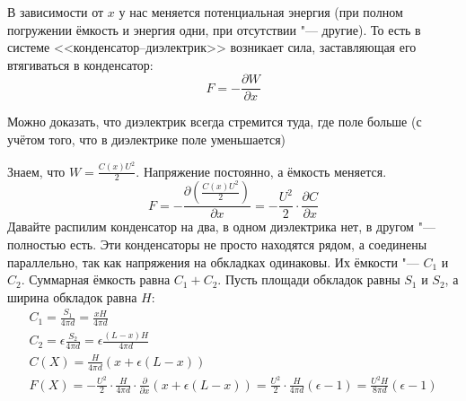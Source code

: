 		В зависимости от $x$ у нас меняется потенциальная энергия (при полном погружении ёмкость и энергия одни,
		при отсутствии "--- другие).
		То есть в системе <<конденсатор--диэлектрик>> возникает сила, заставляющая его втягиваться в конденсатор:
		\[ F = - \frac{\partial W}{\partial x} \]
		\begin{Rem}
			Можно доказать, что диэлектрик всегда стремится туда, где поле больше
			(с учётом того, что в диэлектрике поле уменьшается)
		\end{Rem}

		Знаем, что $W = \frac{C(x)U^2}{2}$.
		Напряжение постоянно, а ёмкость меняется.
		\[F = -\frac{\partial\left(\frac{C(x)U^2}{2}\right)}{\partial x} = -\frac{U^2}{2} \cdot \frac{\partial C}{\partial x}\]
		Давайте распилим конденсатор на два, в одном диэлектрика нет, в другом "--- полностью есть.
		Эти конденсаторы не просто находятся рядом, а соединены параллельно, так как напряжения на обкладках одинаковы.
		Их ёмкости "--- $C_1$ и $C_2$.
		Суммарная ёмкость равна $C_1+C_2$.
		Пусть площади обкладок равны $S_1$ и $S_2$, а ширина обкладок равна $H$:
		\begin{gather*}
		C_1=\frac{S_1}{4\pi d} = \frac{xH}{4\pi d} \\
		C_2=\epsilon\frac{S_2}{4\pi d} = \epsilon\frac{(L-x)H}{4\pi d} \\
		C(X) = \frac{H}{4\pi d}(x+\epsilon(L-x)) \\
		F(X) = -\frac{U^2}{2} \cdot \frac{H}{4\pi d} \cdot \frac{\partial}{\partial x}(x + \epsilon(L-x))
		     = \frac{U^2}{2} \cdot \frac{H}{4\pi d}(\epsilon-1)
		     = \frac{U^2H}{8\pi d} (\epsilon-1)
		\end{gather*}
